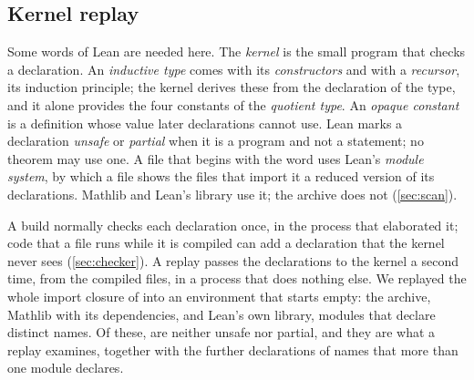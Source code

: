 \subsection{Kernel replay}\label{sec:replay}
Some words of Lean are needed here. The \emph{kernel} is the small program that checks a
declaration. An \emph{inductive type} comes with its \emph{constructors} and with a
\emph{recursor}, its induction principle; the kernel derives these from the declaration of
the type, and it alone provides the four constants of the \emph{quotient type}. An
\emph{opaque constant} is a definition whose value later declarations cannot use. Lean marks
a declaration \emph{unsafe} or \emph{partial} when it is a program and not a statement; no
theorem may use one. A file that begins with the word  uses Lean's \emph{module
system}, by which a file shows the files that import it a reduced version of its
declarations. Mathlib and Lean's library use it; the archive does not (\cref{sec:scan}).

A build normally checks each declaration once, in the process that elaborated it; code that a
file runs while it is compiled can add a declaration that the kernel never sees
(\cref{sec:checker}). A replay passes the declarations to the kernel a second time, from the
compiled files, in a process that does nothing else. We replayed the whole import closure of
 into an environment that starts empty: the archive, Mathlib with its
dependencies, and Lean's own library, \replaymodules{} modules that declare
\replayconstants{} distinct names. Of these, \replaydecls{} are neither unsafe nor partial,
and they are what a replay examines, together with the further declarations of names that
more than one module declares.

